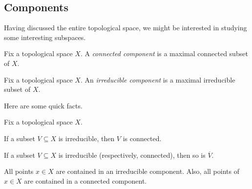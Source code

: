 \documentclass[../notes.tex]{subfiles}
\begin{document}
\subsection{Components}
Having discussed the entire topological space, we might be interested in studying some interesting subspaces.
\begin{definition}
	Fix a topological space $X$. A \textit{connected component} is a maximal connected subset of $X$.
\end{definition}
\begin{definition}
	Fix a topological space $X$. An \textit{irreducible component} is a maximal irreducible subset of $X$.
\end{definition}
Here are some quick facts.
\begin{lemma} \label{lem:componentsexist}
	Fix a topological space $X$.
	\begin{listalph}
		\item If a subset $V\subseteq X$ is irreducible, then $V$ is connected.
		\item If a subset $V\subseteq X$ is irreducible (respectively, connected), then so is $\overline V$.
		\item All points $x\in X$ are contained in an irreducible component. Also, all points of $x\in X$ are contained in a connected component.
	\end{listalph}
\end{lemma}
\end{document}
